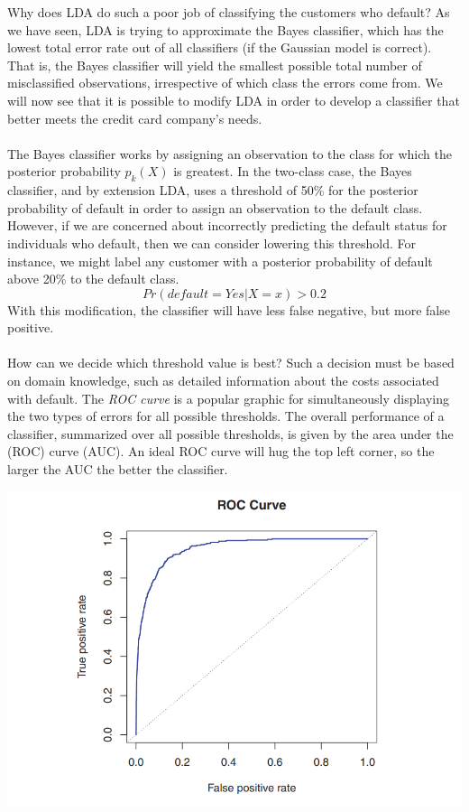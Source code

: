 Why does LDA do such a poor job of classifying the customers who default? As we have
seen, LDA is trying to approximate the Bayes classifier, which has the lowest total error rate out of all classifiers (if the Gaussian model is correct). That is, the Bayes classifier will yield the smallest possible total number of misclassified observations, irrespective of which class the errors come from. We will now see that it is possible to modify LDA in order to develop a classifier that better meets the credit card company’s needs.\\\\
The Bayes classifier works by assigning an observation to the class for which the posterior probability $p_k(X)$ is greatest. In the two-class case, the Bayes classifier, and by extension LDA, uses a threshold of 50\% for the posterior probability of default in order to assign an observation to the default class. However, if we are concerned about incorrectly predicting the default status for individuals who default, then we can consider
lowering this threshold. For instance, we might label any customer with a
posterior probability of default above 20\% to the default class.
\[Pr(default = Yes|X = x) > 0.2\]
With this modification, the classifier will have less false negative, but more false positive.\\\\
How can we decide which threshold value is best? Such a decision must be based on domain knowledge, such as detailed information about the costs associated with default. The \textit{ROC curve} is a popular graphic for simultaneously displaying the two types of errors for all possible thresholds. The overall performance of a classifier, summarized over all possible thresholds, is given by the area under the (ROC) curve (AUC). An ideal ROC curve will hug the top left corner, so the larger the AUC the better the classifier.
\begin{center}
    \includegraphics[scale=0.7]{images/ROC.png}
\end{center}
